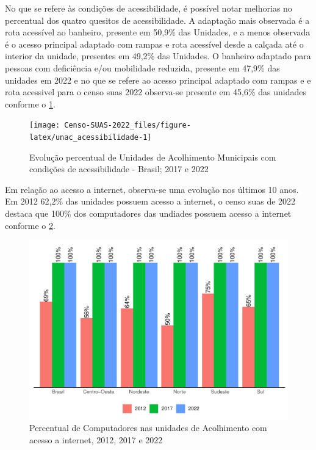 \documentclass[
  brazilian]{report}
\begin{document}
No que se refere às condições de acessibilidade, é possível notar
melhorias no percentual dos quatro quesitos de acessibilidade. A
adaptação mais observada é a rota acessível ao banheiro, presente em
50,9\% das Unidades, e a menos observada é o acesso principal adaptado
com rampas e rota acessível desde a calçada até o interior da unidade,
presentes em 49,2\% das Unidades. O banheiro adaptado para pessoas com
deficiência e/ou mobilidade reduzida, presente em 47,9\% das unidades em
2022 e no que se refere ao acesso principal adaptado com rampas e e rota
acessivel para o censo suas 2022 observa-se presente em 45,6\% das
unidades conforme o \cref{fig:unac_acessibilidade}.

\begin{figure}
\texttt{[image: Censo-SUAS-2022\_files/figure-latex/unac\_acessibilidade-1]} \caption[Evolução percentual de Unidades de Acolhimento Municipais com condições de acessibilidade - Brasil]{Evolução percentual de Unidades de Acolhimento Municipais com condições de acessibilidade - Brasil; 2017 e 2022}\label{fig:unac_acessibilidade}
\end{figure}

Em relação ao acesso a internet, observa-se uma evolução nos últimos 10
anos. Em 2012 62,2\% das unidades possuem acesso a internet, o censo
suas de 2022 destaca que 100\% dos computadores das undiades possuem
acesso a internet conforme o \cref{fig:unac-internet}.

\begin{figure}
\includegraphics{Censo-SUAS-2022_files/figure-latex/unac-internet-1} \caption[Percentual de Computadores nas unidades de Acolhimento com acesso a internet, 2012, 2017 e 2022]{Percentual de Computadores nas unidades de Acolhimento com acesso a internet, 2012, 2017 e 2022}\label{fig:unac-internet}
\end{figure}
\end{document}
